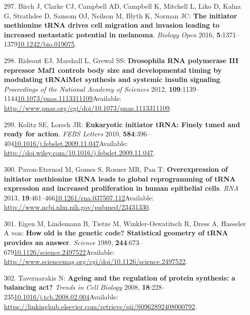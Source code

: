 \documentclass[
]{book}
\begin{document}
\leavevmode\hypertarget{ref-Birch2016}{}%
297. Birch J, Clarke CJ, Campbell AD, Campbell K, Mitchell L, Liko D, Kalna G, Strathdee D, Sansom OJ, Neilson M, Blyth K, Norman JC: \textbf{The initiator methionine tRNA drives cell migration and invasion leading to increased metastatic potential in melanoma}. \emph{Biology Open} 2016, \textbf{5}:1371--1379\href{https://doi.org/10.1242/bio.019075}{10.1242/bio.019075}.

\leavevmode\hypertarget{ref-Rideout2012}{}%
298. Rideout EJ, Marshall L, Grewal SS: \textbf{Drosophila RNA polymerase III repressor Maf1 controls body size and developmental timing by modulating tRNAiMet synthesis and systemic insulin signaling}. \emph{Proceedings of the National Academy of Sciences} 2012, \textbf{109}:1139--1144\href{https://doi.org/10.1073/pnas.1113311109}{10.1073/pnas.1113311109}Available: \url{http://www.pnas.org/cgi/doi/10.1073/pnas.1113311109}.

\leavevmode\hypertarget{ref-Kolitz2010}{}%
299. Kolitz SE, Lorsch JR: \textbf{Eukaryotic initiator tRNA: Finely tuned and ready for action}. \emph{FEBS Letters} 2010, \textbf{584}:396--404\href{https://doi.org/10.1016/j.febslet.2009.11.047}{10.1016/j.febslet.2009.11.047}Available: \url{http://doi.wiley.com/10.1016/j.febslet.2009.11.047}.

\leavevmode\hypertarget{ref-Pavon-Eternod2013}{}%
300. Pavon-Eternod M, Gomes S, Rosner MR, Pan T: \textbf{Overexpression of initiator methionine tRNA leads to global reprogramming of tRNA expression and increased proliferation in human epithelial cells}. \emph{RNA} 2013, \textbf{19}:461--466\href{https://doi.org/10.1261/rna.037507.112}{10.1261/rna.037507.112}Available: \url{http://www.ncbi.nlm.nih.gov/pubmed/23431330}.

\leavevmode\hypertarget{ref-Eigen1989}{}%
301. Eigen M, Lindemann B, Tietze M, Winkler-Oswatitsch R, Dress A, Haeseler A von: \textbf{How old is the genetic code? Statistical geometry of tRNA provides an answer}. \emph{Science} 1989, \textbf{244}:673--679\href{https://doi.org/10.1126/science.2497522}{10.1126/science.2497522}Available: \url{http://www.sciencemag.org/cgi/doi/10.1126/science.2497522}.

\leavevmode\hypertarget{ref-Tavernarakis2008}{}%
302. Tavernarakis N: \textbf{Ageing and the regulation of protein synthesis: a balancing act?} \emph{Trends in Cell Biology} 2008, \textbf{18}:228--235\href{https://doi.org/10.1016/j.tcb.2008.02.004}{10.1016/j.tcb.2008.02.004}Available: \url{https://linkinghub.elsevier.com/retrieve/pii/S0962892408000792}.
\end{document}
